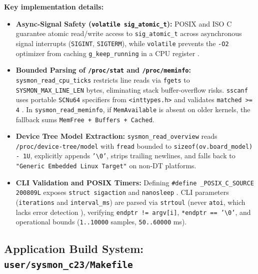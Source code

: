 \documentclass[11pt,a4paper]{article}
\begin{document}
\textbf{Key implementation details:}
\begin{itemize}
\item \textbf{Async-Signal Safety (\texttt{volatile sig\_atomic\_t}):} POSIX and ISO C guarantee atomic read/write access to \texttt{sig\_atomic\_t} across asynchronous signal interrupts (\texttt{SIGINT}, \texttt{SIGTERM}), while \texttt{volatile} prevents the \texttt{-O2} optimizer from caching \texttt{g\_keep\_running} in a CPU register \cite{man_sigaction,seacord2020}.
\item \textbf{Bounded Parsing of \texttt{/proc/stat} and \texttt{/proc/meminfo}:} \texttt{sysmon\_read\_cpu\_ticks} restricts line reads via \texttt{fgets} to \texttt{SYSMON\_MAX\_LINE\_LEN} bytes, eliminating stack buffer-overflow risks. \texttt{sscanf} uses portable \texttt{SCNu64} specifiers from \texttt{<inttypes.h>} and validates \texttt{matched >= 4} \cite{man_proc}. In \texttt{sysmon\_read\_meminfo}, if \texttt{MemAvailable} is absent on older kernels, the fallback sums \texttt{MemFree + Buffers + Cached}.
\item \textbf{Device Tree Model Extraction:} \texttt{sysmon\_read\_overview} reads \texttt{/proc/device-tree/model} with \texttt{fread} bounded to \texttt{sizeof(ov.board\_model) - 1U}, explicitly appends \texttt{'\textbackslash 0'}, strips trailing newlines, and falls back to \texttt{"Generic Embedded Linux Target"} on non-DT platforms.
\item \textbf{CLI Validation and POSIX Timers:} Defining \texttt{\#define \_POSIX\_C\_SOURCE 200809L} exposes \texttt{struct sigaction} and \texttt{nanosleep} \cite{man_sigaction}. CLI parameters (\texttt{iterations} and \texttt{interval\_ms}) are parsed via \texttt{strtoul} (never \texttt{atoi}, which lacks error detection \cite{seacord2020}), verifying \texttt{endptr != argv[i]}, \texttt{*endptr == '\textbackslash 0'}, and operational bounds (\texttt{1..10000} samples, \texttt{50..60000} ms).
\end{itemize}

\subsection{Application Build System: \texttt{user/sysmon\_c23/Makefile}}
\end{document}
